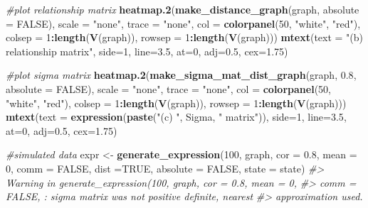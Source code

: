 \documentclass[]{article}
\newenvironment{Shaded}{\begin{snugshade}}{\end{snugshade}}
\newcommand{\CommentTok}[1]{\textcolor[rgb]{0.56,0.35,0.01}{\textit{#1}}}
\newcommand{\DataTypeTok}[1]{\textcolor[rgb]{0.13,0.29,0.53}{#1}}
\newcommand{\DecValTok}[1]{\textcolor[rgb]{0.00,0.00,0.81}{#1}}
\newcommand{\FloatTok}[1]{\textcolor[rgb]{0.00,0.00,0.81}{#1}}
\newcommand{\KeywordTok}[1]{\textcolor[rgb]{0.13,0.29,0.53}{\textbf{#1}}}
\newcommand{\NormalTok}[1]{#1}
\newcommand{\OperatorTok}[1]{\textcolor[rgb]{0.81,0.36,0.00}{\textbf{#1}}}
\newcommand{\OtherTok}[1]{\textcolor[rgb]{0.56,0.35,0.01}{#1}}
\newcommand{\StringTok}[1]{\textcolor[rgb]{0.31,0.60,0.02}{#1}}
\begin{document}
\begin{Shaded}
\begin{Highlighting}[]
\CommentTok{#plot relationship matrix}
\KeywordTok{heatmap.2}\NormalTok{(}\KeywordTok{make_distance_graph}\NormalTok{(graph, }\DataTypeTok{absolute =} \OtherTok{FALSE}\NormalTok{),}
          \DataTypeTok{scale =} \StringTok{"none"}\NormalTok{, }\DataTypeTok{trace =} \StringTok{"none"}\NormalTok{, }\DataTypeTok{col =} \KeywordTok{colorpanel}\NormalTok{(}\DecValTok{50}\NormalTok{, }\StringTok{"white"}\NormalTok{, }\StringTok{"red"}\NormalTok{),}
\DataTypeTok{colsep =} \DecValTok{1}\OperatorTok{:}\KeywordTok{length}\NormalTok{(}\KeywordTok{V}\NormalTok{(graph)), }\DataTypeTok{rowsep =} \DecValTok{1}\OperatorTok{:}\KeywordTok{length}\NormalTok{(}\KeywordTok{V}\NormalTok{(graph)))}
\KeywordTok{mtext}\NormalTok{(}\DataTypeTok{text =} \StringTok{"(b) relationship matrix"}\NormalTok{, }\DataTypeTok{side=}\DecValTok{1}\NormalTok{, }\DataTypeTok{line=}\FloatTok{3.5}\NormalTok{, }\DataTypeTok{at=}\DecValTok{0}\NormalTok{, }\DataTypeTok{adj=}\FloatTok{0.5}\NormalTok{, }\DataTypeTok{cex=}\FloatTok{1.75}\NormalTok{)}

\CommentTok{#plot sigma matrix}
\KeywordTok{heatmap.2}\NormalTok{(}\KeywordTok{make_sigma_mat_dist_graph}\NormalTok{(graph, }\FloatTok{0.8}\NormalTok{, }\DataTypeTok{absolute =} \OtherTok{FALSE}\NormalTok{),}
\DataTypeTok{scale =} \StringTok{"none"}\NormalTok{, }\DataTypeTok{trace =} \StringTok{"none"}\NormalTok{, }\DataTypeTok{col =} \KeywordTok{colorpanel}\NormalTok{(}\DecValTok{50}\NormalTok{, }\StringTok{"white"}\NormalTok{, }\StringTok{"red"}\NormalTok{),}
\DataTypeTok{colsep =} \DecValTok{1}\OperatorTok{:}\KeywordTok{length}\NormalTok{(}\KeywordTok{V}\NormalTok{(graph)), }\DataTypeTok{rowsep =} \DecValTok{1}\OperatorTok{:}\KeywordTok{length}\NormalTok{(}\KeywordTok{V}\NormalTok{(graph)))}
\KeywordTok{mtext}\NormalTok{(}\DataTypeTok{text =} \KeywordTok{expression}\NormalTok{(}\KeywordTok{paste}\NormalTok{(}\StringTok{"(c) "}\NormalTok{, Sigma, }\StringTok{" matrix"}\NormalTok{)), }\DataTypeTok{side=}\DecValTok{1}\NormalTok{, }\DataTypeTok{line=}\FloatTok{3.5}\NormalTok{, }\DataTypeTok{at=}\DecValTok{0}\NormalTok{, }\DataTypeTok{adj=}\FloatTok{0.5}\NormalTok{, }\DataTypeTok{cex=}\FloatTok{1.75}\NormalTok{)}

\CommentTok{#simulated data}
\NormalTok{expr <-}\StringTok{ }\KeywordTok{generate_expression}\NormalTok{(}\DecValTok{100}\NormalTok{, graph, }\DataTypeTok{cor =} \FloatTok{0.8}\NormalTok{, }\DataTypeTok{mean =} \DecValTok{0}\NormalTok{,}
\DataTypeTok{comm =} \OtherTok{FALSE}\NormalTok{, }\DataTypeTok{dist =}\OtherTok{TRUE}\NormalTok{, }\DataTypeTok{absolute =} \OtherTok{FALSE}\NormalTok{, }\DataTypeTok{state =}\NormalTok{ state)}
\CommentTok{#> Warning in generate_expression(100, graph, cor = 0.8, mean = 0,}
\CommentTok{#> comm = FALSE, : sigma matrix was not positive definite, nearest}
\CommentTok{#> approximation used.}


\end{Highlighting}
\end{Shaded}
\end{document}
